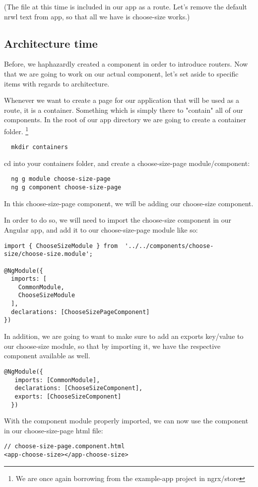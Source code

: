 (The file at this time is included in our app as a route. Let's remove the
default nrwl text from app, so that all we have is choose-size works.)

\subsection{Architecture time}

Before, we haphazardly created a component in order to introduce routers. Now
that we are going to work on our actual component, let's set aside to specific
items with regards to architecture.

Whenever we want to create a page for our application that will be used as a
route, it is a container. Something which is simply there to "contain" all of
our components. In the root of our app directory we are going to create a
container folder. \footnote{We are once again borrowing from the example-app
project in ngrx/store}

\begin{verbatim}
  mkdir containers
\end{verbatim} 

cd into your containers folder, and create a choose-size-page module/component:
\begin{verbatim}
  ng g module choose-size-page
  ng g component choose-size-page
\end{verbatim}

In this choose-size-page component, we will be adding our choose-size component.

In order to do so, we will need to import the choose-size component in our Angular
app, and add it to our choose-size-page module like so:

\begin{lstlisting}[caption=Importing the choose-size module]
import { ChooseSizeModule } from  '../../components/choose-size/choose-size.module';

@NgModule({
  imports: [
    CommonModule,
    ChooseSizeModule
  ],
  declarations: [ChooseSizePageComponent]
})
\end{lstlisting}

In addition, we are going to want to make sure to add an exports key/value to
our choose-size module, so that by importing it, we have the respective
component available as well.

\begin{lstlisting}[caption=Adding choose-size component as export]
  @NgModule({
   imports: [CommonModule],
   declarations: [ChooseSizeComponent],
   exports: [ChooseSizeComponent]
  })
\end{lstlisting}

With the component module properly imported, we can now use the component in our
choose-size-page html file:
\begin{verbatim}
// choose-size-page.component.html
<app-choose-size></app-choose-size>
\end{verbatim}
